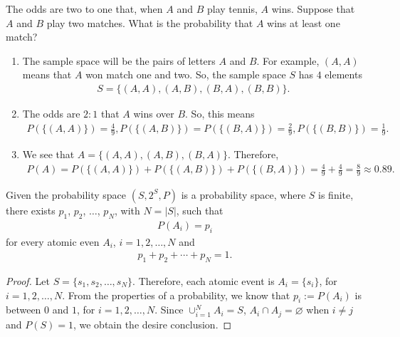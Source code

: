\begin{example}
The odds are two to one that, when $A$ and $B$ play tennis, $A$ wins. Suppose that $A$ and $B$ play two matches. What is the probability that $A$ wins at least one match?
\end{example}

\begin{sol*}
\begin{enumerate}[label=\Circled{\arabic*}]
\item The sample space will be the pairs of letters $A$ and $B$. For example, $(A, A)$ means that $A$ won match one and two. So, the sample space $S$ has $4$ elements 
	\begin{align*}
	S = \{ (A, A) , (A, B) , (B, A) , (B, B) \} .
	\end{align*}
\item The odds are $2:1$ that $A$ wins over $B$. So, this means
	\begin{align*}
	P ( \{ (A , A) \} ) = \frac{4}{9} , P ( \{ (A, B) \} ) = P ( \{ (B, A) \} ) = \frac{2}{9} , P ( \{ (B, B) \} ) = \frac{1}{9} .
	\end{align*}
\item We see that $A = \{ (A, A) , (A, B) , (B, A) \}$. Therefore,
	\begin{align*}
	P (A) = P ( \{ (A, A) \} ) + P (\{ (A, B) \} ) + P (\{ (B, A) \}) = \frac{4}{9} + \frac{4}{9} = \frac{8}{9} \approx 0.89 . \tag*{$\triangle$}
	\end{align*}
\end{enumerate}
\end{sol*}

\begin{theorem}
Given the probability space $(S, 2^S , P )$ is a probability space, where $S$ is finite, there exists $p_1$, $p_2$, $\ldots$, $p_N$, with $N = |S|$, such that
	\begin{align*}
	P (A_i) = p_i
	\end{align*}
for every atomic even $A_i$, $i = 1 , 2, \ldots , N$ and
	\begin{align*}
	p_1 + p_2 + \cdots + p_N = 1 .
	\end{align*}
\end{theorem}
\begin{proof}
Let $S = \{ s_1 , s_2, \ldots , s_N \}$. Therefore, each atomic event is $A_i = \{ s_i \}$, for $i = 1 , 2, \ldots , N$. From the properties of a probability, we know that $p_i := P (A_i)$ is between $0$ and $1$, for $i = 1 , 2, \ldots , N$. Since $\cup_{i = 1}^N A_i = S$, $A_i \cap A_j = \varnothing$ when $i \neq j$ and $P (S) = 1$, we obtain the desire conclusion.
\end{proof}


